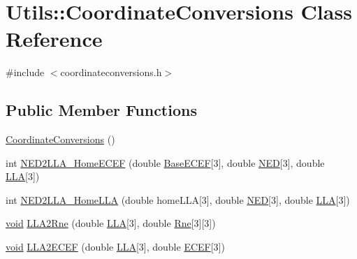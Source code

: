 \hypertarget{class_utils_1_1_coordinate_conversions}{\section{\-Utils\-:\-:\-Coordinate\-Conversions \-Class \-Reference}
\label{class_utils_1_1_coordinate_conversions}
}


{\ttfamily \#include $<$coordinateconversions.\-h$>$}

\subsection*{\-Public \-Member \-Functions}
\begin{DoxyCompactItemize}
\item 
\hyperlink{class_utils_1_1_coordinate_conversions_a67dec67c0b9491d9b3135d5cc6ad67d1}{\-Coordinate\-Conversions} ()
\item 
int \hyperlink{class_utils_1_1_coordinate_conversions_ae2c8e0f3a749495b4fce5a42dff87302}{\-N\-E\-D2\-L\-L\-A\-\_\-\-Home\-E\-C\-E\-F} (double \hyperlink{_o_p_plots_8m_ac1ec51a7dd6d455e7752b2436fd61a0c}{\-Base\-E\-C\-E\-F}\mbox{[}3\mbox{]}, double \hyperlink{_o_p_plots_8m_abb3119256791e93ec6e33c8eee7035d6}{\-N\-E\-D}\mbox{[}3\mbox{]}, double \hyperlink{_o_p_plots_8m_ac4d07718b2724e836be86fbe0c8c5704}{\-L\-L\-A}\mbox{[}3\mbox{]})
\item 
int \hyperlink{class_utils_1_1_coordinate_conversions_aa8dc93690408a9522db08f0a13ec12e1}{\-N\-E\-D2\-L\-L\-A\-\_\-\-Home\-L\-L\-A} (double home\-L\-L\-A\mbox{[}3\mbox{]}, double \hyperlink{_o_p_plots_8m_abb3119256791e93ec6e33c8eee7035d6}{\-N\-E\-D}\mbox{[}3\mbox{]}, double \hyperlink{_o_p_plots_8m_ac4d07718b2724e836be86fbe0c8c5704}{\-L\-L\-A}\mbox{[}3\mbox{]})
\item 
\hyperlink{group___u_a_v_objects_plugin_ga444cf2ff3f0ecbe028adce838d373f5c}{void} \hyperlink{class_utils_1_1_coordinate_conversions_afed986b1a4f6cee14a6cf505dd6cf8fd}{\-L\-L\-A2\-Rne} (double \hyperlink{_o_p_plots_8m_ac4d07718b2724e836be86fbe0c8c5704}{\-L\-L\-A}\mbox{[}3\mbox{]}, double \hyperlink{_o_p_plots_8m_a9e7515ae37ebdec7707b65891f31cd6d}{\-Rne}\mbox{[}3\mbox{]}\mbox{[}3\mbox{]})
\item 
\hyperlink{group___u_a_v_objects_plugin_ga444cf2ff3f0ecbe028adce838d373f5c}{void} \hyperlink{class_utils_1_1_coordinate_conversions_adf0d7843c3aa4616bec152ee0ec710a3}{\-L\-L\-A2\-E\-C\-E\-F} (double \hyperlink{_o_p_plots_8m_ac4d07718b2724e836be86fbe0c8c5704}{\-L\-L\-A}\mbox{[}3\mbox{]}, double \hyperlink{_o_p_plots_8m_a749c00b6567f3aec22be08e4a80470f9}{\-E\-C\-E\-F}\mbox{[}3\mbox{]})

\end{DoxyCompactItemize}
